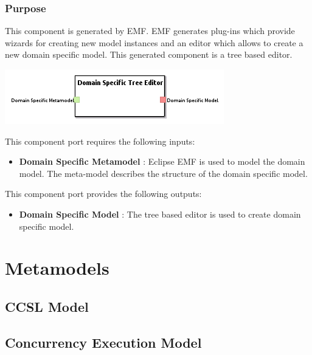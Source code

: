\documentclass{gemoc} %
\begin{document}
\subsubsection{Purpose}
This component is generated by EMF. EMF generates plug-ins which provide wizards for creating new model instances and an editor which allows to create a new domain specific model. This generated component is a tree based editor.
\begin{center}
\includegraphics*[trim=0.0cm 0.0cm 0cm 0.0cm, clip=true]{../images/generated/Generated_Domain_Specific_Tree_Editor.png}
\end{center}

This component port requires the following inputs:
\begin{itemize}
  \item \textbf{Domain Specific Metamodel} :
Eclipse EMF is used to model the domain model. The meta-model describes the structure of the domain specific model.
\end{itemize}

This component port provides the following outputs:
\begin{itemize}
  \item \textbf{Domain Specific Model} :
The tree based editor is used to create domain specific model.
\end{itemize}

\section{Metamodels}
\subsection{CCSL Model}


\subsection{Concurrency Execution Model}
\end{document}
